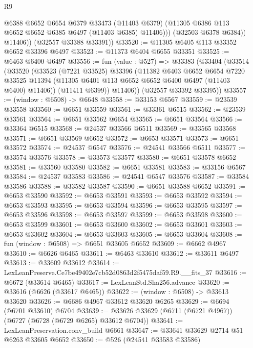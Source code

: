 \begin{lexlean}{R9}
\begin{coremodule}
                @6388
                @6652
                @6654
                @6379
                @33473
                (@11403 @6379)
                (@11305 @6386 @113 @6652 @6652 @6385 @6497 (@11403 @6385) @11406)))
            (@32503 @6378 @6384))
          @11406))
      (@32557 @33388 @33391))
@33520 := @11305 @6405 @113 @33352 @6652 @33396 @6497
@33523 := @11373 @6404 @6655 @33351
@33525 := @6463 @6400 @6497
@33556 := fun (value : @527) =>
  @33383
    (@33404
      (@33514
        (@33520
          (@33523
            (@7221 @33525)
            @33396
            (@11382
              @6403
              @6652
              @6654
              @7220
              @33525
              @11394
              (@11305 @6401 @113 @6652 @6652 @6400 @6497 (@11403 @6400) @11406))
            (@11411 @6399))
          @11406))
      (@32557 @33392 @33395))
@33557 := (window : @6508) -> @6648
@33558 := @33153 @6567
@33559 := @23539 @33558
@33560 := @6651 @33559
@33561 := @33361 @6515
@33562 := @23539 @33561
@33564 := @6651 @33562 @6654
@33565 := @6651 @33564
@33566 := @33364 @6515
@33568 := @24537 @33566 @6511
@33569 := @33565 @33568
@33571 := @6651 @33569 @6652
@33572 := @6653 @33571
@33573 := @6651 @33572
@33574 := @24537 @6547
@33576 := @24541 @33566 @6511
@33577 := @33574 @33576
@33578 := @33573 @33577
@33580 := @6651 @33578 @6652
@33581 := @33560 @33580
@33582 := @6651 @33581
@33583 := @33156 @6567
@33584 := @24537 @33583
@33586 := @24541 @6547 @33576
@33587 := @33584 @33586
@33588 := @33582 @33587
@33590 := @6651 @33588 @6652
@33591 := @6653 @33590
@33592 := @6653 @33591
@33593 := @6653 @33592
@33594 := @6653 @33593
@33595 := @6653 @33594
@33596 := @6653 @33595
@33597 := @6653 @33596
@33598 := @6653 @33597
@33599 := @6653 @33598
@33600 := @6653 @33599
@33601 := @6653 @33600
@33602 := @6653 @33601
@33603 := @6653 @33602
@33604 := @6653 @33603
@33605 := @6653 @33604
@33608 := fun (window : @6508) => @6651 @33605 @6652
@33609 := @6662 @4967
@33610 := @6626 @6465
@33611 := @6463 @33610
@33612 := @33611 @6497
@33613 := @33609 @33612
@33614 := LexLeanPreserve.Ce7be49402e7cb52d0863d2f5475daf59.R9.__fits_37
@33616 := @6672 (@33614 @6465)
@33617 := LexLeanStd.Sha256.advance
@33620 := @33616 (@6626 (@33617 @6465))
@33622 := (window : @6508) -> @33613 @33620
@33626 := @6686 @4967 @33612 @33620 @6265
@33629 := @6694 (@6701 @33610) @6704
@33639 := @33626 @33629 (@6711 (@6721 @4967)) (@6727 (@6728 (@6729 @6265) @33612 @6704))
@33641 := LexLeanPreservation.conv_build @6661
@33647 := @33641 @33629 @2714 @51 @6263 @33605 @6652
@33650 := @526 (@24541 @33583 @33586)

\end{coremodule}
\end{lexlean}

